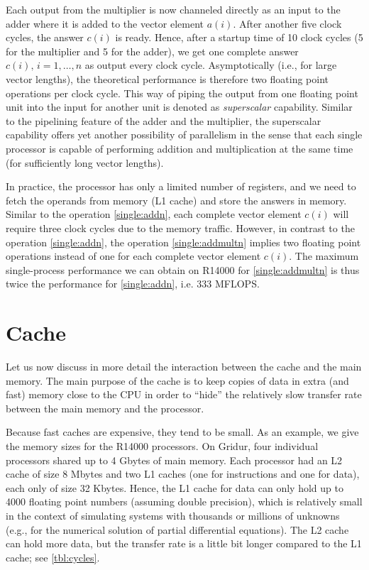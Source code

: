 Each output from the multiplier is now channeled directly as an input to the
adder where it is added to the vector element $a(i)$. After another five clock
cycles, the answer $c(i)$ is ready. Hence, after a startup time of 10 clock
cycles (5 for the multiplier and 5 for the adder), we get one complete answer
$c(i), \, i=1,\ldots,n$ as output every clock cycle. Asymptotically (i.e., for
large vector lengths), the theoretical performance is therefore two floating
point operations per clock cycle. This way of piping the output from one
floating point unit into the input for another unit is denoted as
\emph{superscalar} capability. Similar to the pipelining feature of the adder
and the multiplier, the superscalar capability offers yet another possibility of
parallelism in the sense that each single processor is capable of performing
addition and multiplication at the same time (for sufficiently long vector
lengths).

In practice, the processor has only a limited number of registers, and we need
to fetch the operands from memory (L1 cache) and store the answers in memory.
Similar to the operation \eqref{single:addn}, each complete vector element
$c(i)$ will require three clock cycles due to the memory traffic. However, in
contrast to the operation \eqref{single:addn}, the operation
\eqref{single:addmultn} implies two floating point operations instead of one for
each complete vector element $c(i)$. The maximum single-process performance we
can obtain on R14000 for \eqref{single:addmultn} is thus twice the performance
for \eqref{single:addn}, i.e. 333 MFLOPS.

\section{Cache}

Let us now discuss in more detail the interaction between the cache and the main
memory. The main purpose of the cache is to keep copies of data in extra (and
fast) memory close to the CPU in order to ``hide'' the relatively slow transfer
rate between the main memory and the processor.

Because fast caches are expensive, they tend to be small. As an example, we give
the memory sizes for the R14000 processors. On Gridur, four individual
processors shared up to 4 Gbytes of main memory. Each processor had an L2 cache
of size 8 Mbytes and two L1 caches (one for instructions and one for data), each
only of size 32 Kbytes. Hence, the L1 cache for data can only hold up to 4000
floating point numbers (assuming double precision), which is relatively small in
the context of simulating systems with thousands or millions of unknowns (e.g.,
for the numerical solution of partial differential equations). The L2 cache can
hold more data, but the transfer rate is a little bit longer compared to the L1
cache; see \autoref{tbl:cycles}.

